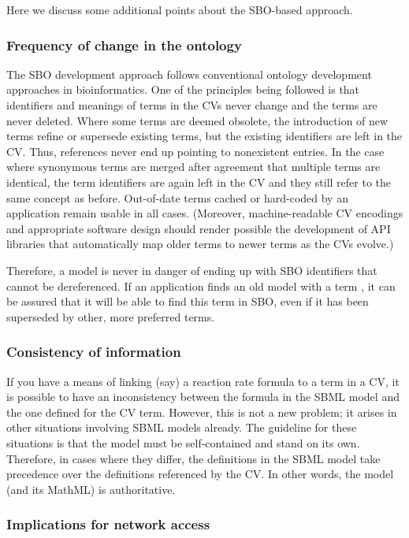 Here we discuss some additional points about the SBO-based
approach.

\subsubsection{Frequency of change in the ontology}
\label{sec:sbo-frequency-of-change}

The SBO development approach follows conventional ontology
development approaches in bioinformatics.  One of the principles
being followed is that identifiers and meanings of terms in the
CVs never change and the terms are never deleted.  Where some
terms are deemed obsolete, the introduction of new terms refine or
supersede existing terms, but the existing identifiers are left in
the CV.  Thus, references never end up pointing to nonexistent
entries.  In the case where synonymous terms are merged after
agreement that multiple terms are identical, the term identifiers
are again left in the CV and they still refer to the same concept
as before.  Out-of-date terms cached or hard-coded by an
application remain usable in all cases.  (Moreover, machine-readable
CV encodings and appropriate software design should render
possible the development of API libraries that automatically map
older terms to newer terms as the CVs evolve.)

Therefore, a model is never in danger of ending up with SBO
identifiers that cannot be dereferenced.  If an application finds
an old model with a term , it can be assured
that it will be able to find this term in SBO, even if it has been
superseded by other, more preferred terms.

\subsubsection{Consistency of information}

If you have a means of linking (say) a reaction rate formula to a
term in a CV, it is possible to have an inconsistency between the
formula in the SBML model and the one defined for the CV term.
However, this is not a new problem; it arises in other situations
involving SBML models already.  The guideline for these situations
is that the model must be self-contained and stand on its own.
Therefore, in cases where they differ, the definitions in the SBML
model take precedence over the definitions referenced by the CV.
In other words, the model (and its MathML) is authoritative.


\subsubsection{Implications for network access}
\label{sec:sbo-implications-for-network-access}

